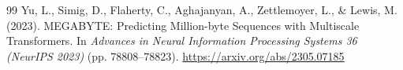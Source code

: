 \documentclass{article}
\begin{document}
\begin{thebibliography}{99}
Yu, L., Simig, D., Flaherty, C., Aghajanyan, A., Zettlemoyer, L., \& Lewis, M. (2023). MEGABYTE: Predicting Million-byte Sequences with Multiscale Transformers. In \emph{Advances in Neural Information Processing Systems 36 (NeurIPS 2023)} (pp. 78808--78823). \url{https://arxiv.org/abs/2305.07185}

\end{thebibliography}
\end{document}
